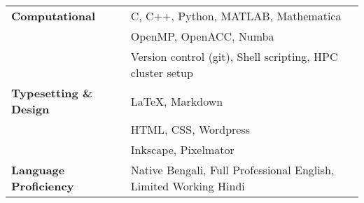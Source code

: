 \begin{longtable}[l]{@{} m{4.75cm} m{12cm}}
\textbf{Computational} & C, C++, Python, MATLAB, Mathematica\\
                                  & OpenMP, OpenACC, Numba\\
                                  & Version control (git), Shell scripting, HPC cluster setup\\[0.2cm]

\textbf{Typesetting \& Design} & \LaTeX, Markdown \\
                                                          & HTML, CSS, Wordpress \\
                                                          & Inkscape, Pixelmator\\[0.2cm]
                                                            
\textbf{Language Proficiency} & Native Bengali, Full Professional English,  Limited Working Hindi\\                                               
\end{longtable}